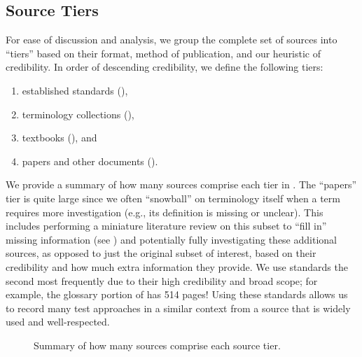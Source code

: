 \ifnotpaper\newpage\fi
\subsection{Source Tiers}\label{source-tiers}
For ease of discussion and analysis, we group the complete set of sources into
``tiers'' based on their format, method of publication, and our heuristic of
credibility. In order of descending credibility, we define the following tiers:
\begin{enumerate}
    \item established standards (),
    \item terminology collections (),
    \item textbooks (), and
    \item papers and other documents ().
\end{enumerate}
We provide a summary of how many sources comprise each tier in
\listAllSrcs{}. The ``papers'' tier is quite large
since we often ``snowball'' on terminology itself when a term requires more
investigation (e.g., its definition is missing or unclear). This includes
performing a miniature literature review on this subset to ``fill in'' missing
information (see ) and potentially fully investigating these
additional sources, as opposed to just the original subset of interest,
based on their credibility and how much extra information they provide.
We use standards the second most frequently due to their high credibility and
broad scope; for example, the glossary portion of \citet{IEEE2017} has 514
pages! Using these standards allows us to record many test approaches in a
similar context from a source that is widely used and well-respected.

\begin{figure}[b!]
    \centering
    \caption{Summary of how many sources comprise each source tier.}
    \label{fig:sourceSummary}
\end{figure}

